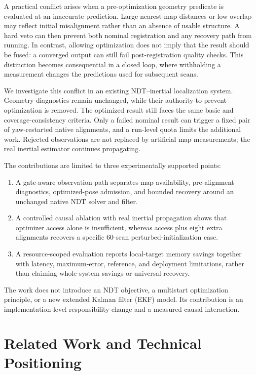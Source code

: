 \documentclass[journal,10pt,letterpaper]{IEEEtran}
\begin{document}
A practical conflict arises when a pre-optimization geometry predicate is evaluated at an inaccurate prediction. Large nearest-map distances or low overlap may reflect initial misalignment rather than an absence of usable structure. A hard veto can then prevent both nominal registration and any recovery path from running. In contrast, allowing optimization does not imply that the result should be fused: a converged output can still fail post-registration quality checks. This distinction becomes consequential in a closed loop, where withholding a measurement changes the predictions used for subsequent scans.

We investigate this conflict in an existing NDT--inertial localization system. Geometry diagnostics remain unchanged, while their authority to prevent optimization is removed. The optimized result still faces the same basic and coverage-consistency criteria. Only a failed nominal result can trigger a fixed pair of yaw-restarted native alignments, and a run-level quota limits the additional work. Rejected observations are not replaced by artificial map measurements; the real inertial estimator continues propagating.

The contributions are limited to three experimentally supported points:
\begin{enumerate}
\item A gate-aware observation path separates map availability, pre-alignment diagnostics, optimized-pose admission, and bounded recovery around an unchanged native NDT solver and filter.
\item A controlled causal ablation with real inertial propagation shows that optimizer access alone is insufficient, whereas access plus eight extra alignments recovers a specific 60-scan perturbed-initialization case.
\item A resource-scoped evaluation reports local-target memory savings together with latency, maximum-error, reference, and deployment limitations, rather than claiming whole-system savings or universal recovery.
\end{enumerate}
The work does not introduce an NDT objective, a multistart optimization principle, or a new extended Kalman filter (EKF) model. Its contribution is an implementation-level responsibility change and a measured causal interaction.

\section{Related Work and Technical Positioning}
\end{document}
